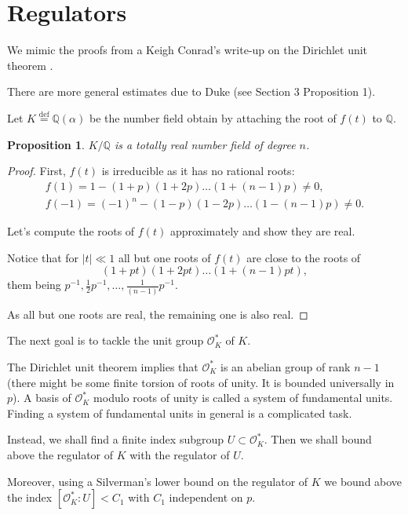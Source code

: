\documentclass[a4paper]{article}
\newcommand{\red}{\textcolor{red}} %
\newtheorem{Prop}[Thm]{Proposition}
\newcommand{\eqdef}{\stackrel{\mathrm{def}}{=}}
\newcommand{\Q}{\mathbb{Q}}        %
\renewcommand{\O}{\mathcal{O}}        %
\begin{document}
\section{Regulators}
We mimic the proofs from a Keigh Conrad's write-up on the Dirichlet unit theorem \cite{conraddirichlet}.

There are more general estimates due to Duke \cite{duke2003extreme} (see Section 3 Proposition 1).


Let $K \eqdef \Q(\alpha)$ be the number field obtain by attaching the root of $f(t)$ to $\Q$.
\begin{Prop}
$K / \Q$ is a totally real number field of degree $n$.
\end{Prop}

\begin{proof}
First, $f(t)$ is irreducible as it has no rational roots: 
\begin{gather}
f(1) = 1 - (1 + p) (1 + 2p) \ldots (1 + (n - 1) p) \ne 0,\\
f(-1) = (-1)^n - (1 - p) (1 - 2p) \ldots (1 - (n - 1) p ) \ne 0.
\end{gather}

Let's compute the roots of $f(t)$ approximately and show they are real.

Notice that for $|t| \ll 1$ all but one roots of $f(t)$ are close to the roots of 
\[
(1 + pt) (1 + 2pt) \ldots (1 + (n - 1) p t)
,\] 
them being $p^{-1} , \frac{1}{2} p^{-1} , \ldots, \frac{1}{(n-1) } p^{-1} $.

As all but one roots are real, the remaining one is also real.
\end{proof}

The next goal is to tackle the unit group $\O_K^*$ of $K$.

The Dirichlet unit theorem implies that $\O_K^*$ is an abelian group of rank $n-1$ (there might be some finite torsion of roots of unity.  It is bounded universally in $p$).
A basis of $\O_K^*$ modulo roots of unity is called a system of fundamental units.
Finding a system of fundamental units in general is a complicated task.

Instead, we shall find a finite index subgroup $U \subset \O_K^*$. 
Then we shall bound above the regulator of $K$ with the regulator of $U$.

Moreover, using a Silverman's lower bound on the regulator of $K$ we bound above the index $[\O_K^*: U] < C_1$ with $C_1$ independent on $p$.
\end{document}
